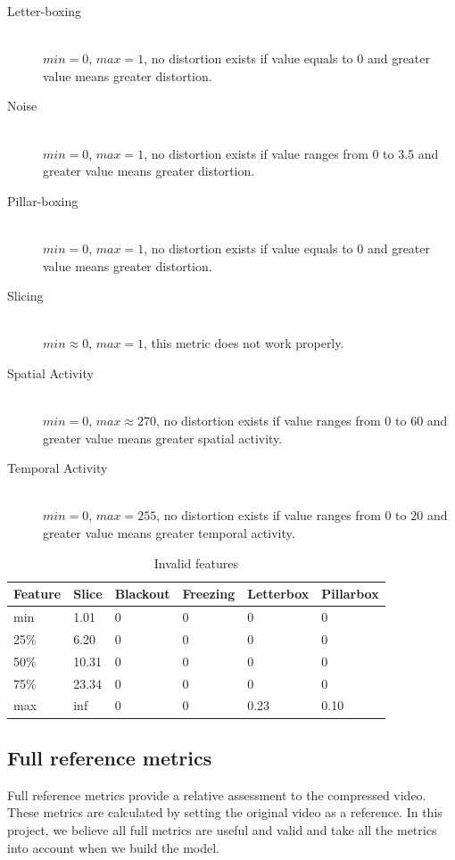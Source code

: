 \documentclass[10pt,conference,compsocconf]{IEEEtran}
\begin{document}
\begin{description}
\item[Letter-boxing] \ \\
  $min = 0$, $max = 1$, no distortion exists if value equals to 0 and greater value means greater distortion.
\item[Noise] \ \\
  $min = 0$, $max = 1$, no distortion exists if value ranges from 0 to 3.5 and greater value means greater distortion.
\item[Pillar-boxing] \ \\
  $min = 0$, $max = 1$, no distortion exists if value equals to 0 and greater value means greater distortion.
\item[Slicing] \ \\
  $min \approx 0$, $max = 1$, this metric does not work properly.
\item[Spatial Activity] \ \\
  $min = 0$, $max \approx 270$, no distortion exists if value ranges from 0 to 60 and greater value means greater spatial activity.
\item[Temporal Activity] \ \\
  $min = 0$, $max = 255$, no distortion exists if value ranges from 0 to 20 and greater value means greater temporal activity.
\end{description}
\begin{table}[htbp]
  \centering
  \begin{tabular}[c]{|l||l|l|l|l|l|}
    \hline
    Feature & Slice & Blackout & Freezing & Letterbox & Pillarbox\\
    \hline
    min & 1.01 & 0 & 0 & 0 & 0\\
    25\% & 6.20 & 0 & 0 & 0 & 0\\
    50\% & 10.31 & 0 & 0 & 0 & 0\\
    75\% & 23.34 & 0 & 0 & 0 & 0\\
    max & inf & 0 & 0 & 0.23 & 0.10\\
    \hline
  \end{tabular}
  \caption{Invalid features}
  \label{drop_feature}
\end{table}
\subsection{Full reference metrics}
Full reference metrics provide a relative assessment to the compressed video. These metrics are calculated by setting the original video as a reference. In this project, we believe all full metrics are useful and valid and take all the metrics into account when we build the model.
\end{document}
